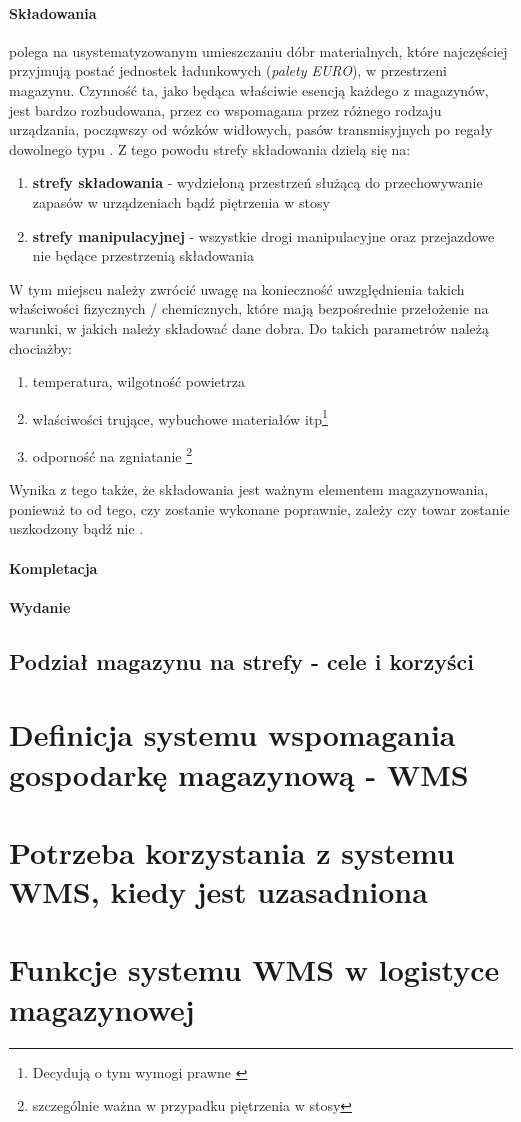 		\paragraph{Składowania} polega na usystematyzowanym umieszczaniu dóbr materialnych, które najczęściej przyjmują
		postać jednostek ładunkowych (\textit{palety EURO}), w przestrzeni magazynu. Czynność ta, jako będąca właściwie
		esencją każdego z magazynów, jest bardzo rozbudowana, przez co wspomagana przez różnego rodzaju urządzania, począwszy
		od wózków widłowych, pasów transmisyjnych po regały dowolnego typu . Z tego powodu strefy składowania dzielą się na:
		\begin{enumerate}
			\item \textbf{strefy składowania} - wydzieloną przestrzeń służącą do 
			przechowywanie zapasów w urządzeniach bądź piętrzenia w stosy
			\item \textbf{strefy manipulacyjnej} - wszystkie drogi manipulacyjne 
			oraz przejazdowe nie będące przestrzenią składowania
		\end{enumerate}	
		W tym miejscu należy zwrócić uwagę na konieczność uwzględnienia takich właściwości fizycznych / chemicznych, które
		mają bezpośrednie przełożenie na warunki, w jakich należy składować dane dobra. Do takich parametrów należą
		chociażby:
		\begin{enumerate}
			\item temperatura, wilgotność powietrza
			\item właściwości trujące, wybuchowe materiałów itp\footnote{Decydują o tym wymogi prawne \cite{ustawa_flamableMaterials}}
			\item odporność na zgniatanie \footnote{szczególnie ważna w przypadku piętrzenia w stosy}
		\end{enumerate}			
		Wynika z tego także, że składowania jest ważnym elementem magazynowania, ponieważ to od tego, czy zostanie
		wykonane poprawnie, zależy czy towar zostanie uszkodzony bądź nie \cite{EWSS}.
	\paragraph{Kompletacja}
	\paragraph{Wydanie}
	
	\subsection{Podział magazynu na strefy - cele i korzyści}
	
\section{Definicja systemu wspomagania gospodarkę magazynową - WMS}
\section{Potrzeba korzystania z systemu WMS, kiedy jest uzasadniona}
\section{Funkcje systemu WMS w logistyce magazynowej}